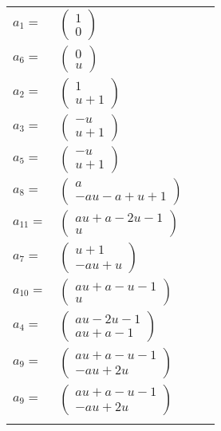 \documentclass[1p]{elsarticle_modified}
\theoremstyle{definition}
\begin{document}
\begin{tabular}{m{7pt} m{180pt} m{7pt} m{180pt} }
\flushright $a_{1}=$&$\begin{pmatrix}1\\0\end{pmatrix}$ \\
\flushright $a_{6}=$&$\begin{pmatrix}0\\u\end{pmatrix}$ \\
\flushright $a_{2}=$&$\begin{pmatrix}1\\u+1\end{pmatrix}$ \\
\flushright $a_{3}=$&$\begin{pmatrix}- u\\u+1\end{pmatrix}$ \\
\flushright $a_{5}=$&$\begin{pmatrix}- u\\u+1\end{pmatrix}$ \\
\flushright $a_{8}=$&$\begin{pmatrix}a\\- a u- a+u+1\end{pmatrix}$ \\
\flushright $a_{11}=$&$\begin{pmatrix}a u+a-2 u-1\\u\end{pmatrix}$ \\
\flushright $a_{7}=$&$\begin{pmatrix}u+1\\- a u+u\end{pmatrix}$ \\
\flushright $a_{10}=$&$\begin{pmatrix}a u+a- u-1\\u\end{pmatrix}$ \\
\flushright $a_{4}=$&$\begin{pmatrix}a u-2 u-1\\a u+a-1\end{pmatrix}$ \\
\flushright $a_{9}=$&$\begin{pmatrix}a u+a- u-1\\- a u+2 u\end{pmatrix}$\\ \flushright $a_{9}=$&$\begin{pmatrix}a u+a- u-1\\- a u+2 u\end{pmatrix}$\\&\end{tabular}
\end{document}
